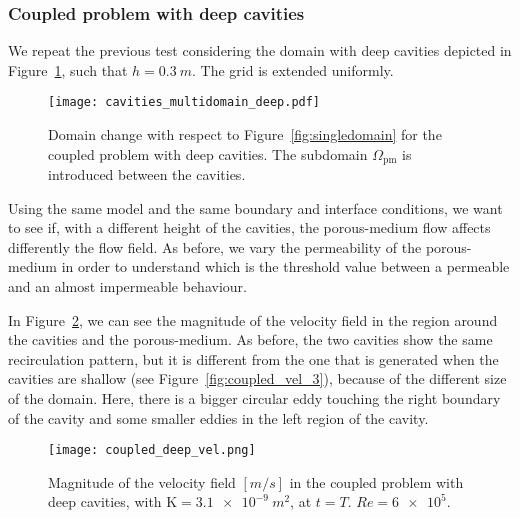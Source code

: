 \subsubsection{Coupled problem with deep cavities}
We repeat the previous test considering the domain with deep cavities depicted in Figure~\ref{fig:multidomain_deep}, such that $h=\SI{0.3}{m}$. The grid is extended uniformly.
\begin{figure}
	\centering
	\texttt{[image: cavities\_multidomain\_deep.pdf]}
	\caption[Domain change with respect to Figure~\ref{fig:singledomain} for the coupled problem with deep cavities]{Domain change with respect to Figure~\ref{fig:singledomain} for the coupled problem with deep cavities. The subdomain $\Omega_\text{pm}$ is introduced between the cavities.}
	\label{fig:multidomain_deep}
\end{figure}
Using the same model and the same boundary and interface conditions, we want to see if, with a different height of the cavities, the porous-medium flow affects differently the flow field. As before, we vary the permeability of the porous-medium in order to understand which is the threshold value between a permeable and an almost impermeable behaviour.

In Figure~\ref{fig:coupled_vel_deep}, we can see the magnitude of the velocity field in the region around the cavities and the porous-medium. As before, the two cavities show the same recirculation pattern, but it is different from the one that is generated when the cavities are shallow (see Figure~\ref{fig:coupled_vel_3}), because of the different size of the domain. Here, there is a bigger circular eddy touching the right boundary of the cavity and some smaller eddies in the left region of the cavity. 
\begin{figure}
	\centering
	\texttt{[image: coupled\_deep\_vel.png]}
	\caption[Magnitude of the velocity field in the coupled problem with deep cavities]{Magnitude of the velocity field $[\si{m/s}]$ in the coupled problem with deep cavities, with $\mathrm{K}=\SI{3.1e-9}{m^2}$, at $t=T$. $Re=\num{6e5}$.}
	\label{fig:coupled_vel_deep}
\end{figure}

